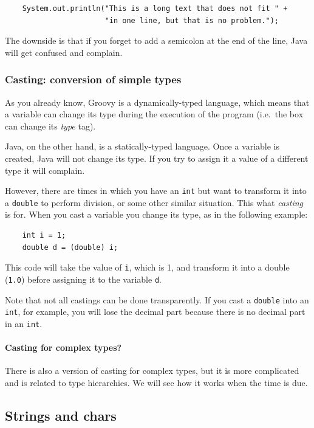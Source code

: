 \begin{verbatim}
    System.out.println("This is a long text that does not fit " + 
                       "in one line, but that is no problem.");
\end{verbatim}

The downside is that if you forget to add a semicolon at the end of
the line, 
Java will get confused and complain. 


\subsubsection{Casting: conversion of simple types}
\label{sec:cast-conv-simple}

As you already know, Groovy is a dynamically-typed language, which
means that a variable can change its type during the execution of the
program (i.e.~the box can change its \emph{type} tag). 

Java, on the other hand, is a statically-typed language. Once a
variable is created, Java will not change its type. If you try to
assign it a value of a different type it will complain.

However, there are times in which you have an \verb+int+ but want to
transform it into a \verb+double+ to perform division, or some other
similar situation. This what \emph{casting} is for. When you cast a
variable you change its type, as in the following example: 

\begin{verbatim}
    int i = 1;
    double d = (double) i;
\end{verbatim}

This code will take the value of \verb+i+, which is 1, and transform
it into a double (\verb+1.0+) before assigning it to the
variable \verb+d+. 

Note that not all castings can be done transparently. If you cast a
\verb+double+ into an \verb+int+, for example, you will lose the
decimal part because there is no decimal part in an \verb+int+. 

\paragraph{Casting for complex types?}
\label{sec:cast-compl-types}

There is also a version of casting for complex types, but it is more
complicated and is related to type hierarchies. We will see how it
works when the time is due.

\subsection{Strings and chars}
\label{sec:strings-chars}

